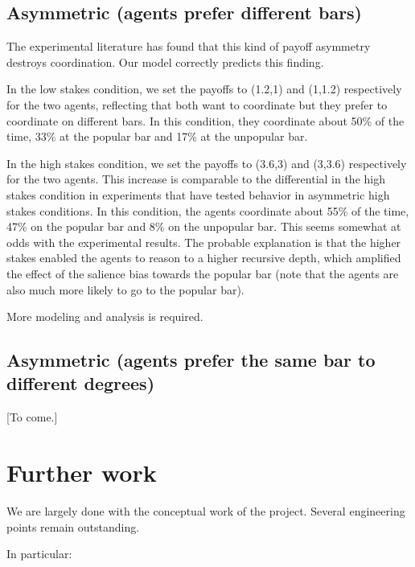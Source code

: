 \subsection{Asymmetric (agents prefer different
bars)}\label{asymmetric-agents-prefer-different-bars}

The experimental literature has found that this kind of payoff asymmetry
destroys coordination. Our model correctly predicts this finding.

In the low stakes condition, we set the payoffs to (1.2,1) and (1,1.2)
respectively for the two agents, reflecting that both want to coordinate
but they prefer to coordinate on different bars. In this condition, they
coordinate about 50\% of the time, 33\% at the popular bar and 17\% at
the unpopular bar.

In the high stakes condition, we set the payoffs to (3.6,3) and (3,3.6)
respectively for the two agents. This increase is comparable to the
differential in the high stakes condition in experiments that have
tested behavior in asymmetric high stakes conditions. In this condition,
the agents coordinate about 55\% of the time, 47\% on the popular bar
and 8\% on the unpopular bar. This seems somewhat at odds with the
experimental results. The probable explanation is that the higher stakes
enabled the agents to reason to a higher recursive depth, which
amplified the effect of the salience bias towards the popular bar (note
that the agents are also much more likely to go to the popular bar).

More modeling and analysis is required.

\subsection{Asymmetric (agents prefer the same bar to different
degrees)}\label{asymmetric-agents-prefer-the-same-bar-to-different-degrees}

{[}To come.{]}

\section{Further work}\label{further-work}

We are largely done with the conceptual work of the project. Several
engineering points remain outstanding.

In particular:

